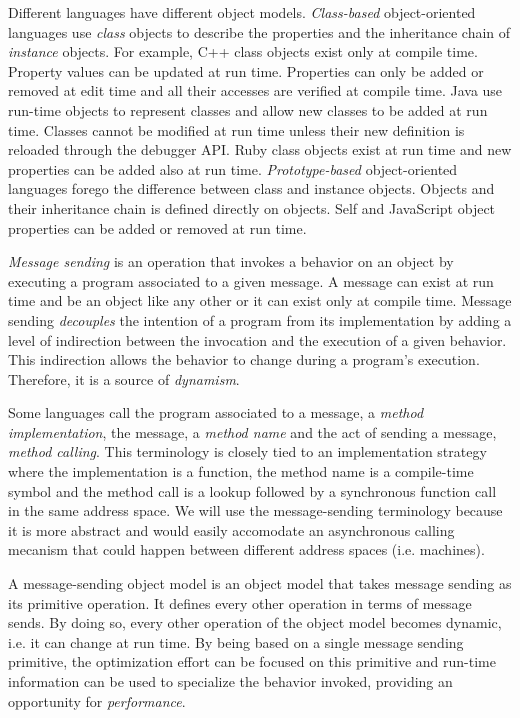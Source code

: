 Different languages have different object models. \textit{Class-based}
object-oriented languages use \textit{class} objects to describe the properties
and the inheritance chain of \textit{instance} objects. For example, C++ class
objects exist only at compile time. Property values can be updated at run time.
Properties can only be added or removed at edit time and all their accesses are
verified at compile time. Java use run-time objects to represent classes and
allow new classes to be added at run time.  Classes cannot be modified at run
time unless their new definition is reloaded through the debugger API. Ruby
class objects exist at run time and new properties can be added also at run
time. \textit{Prototype-based} object-oriented languages forego the difference
between class and instance objects. Objects and their inheritance chain is
defined directly on objects. Self and JavaScript object properties can be
added or removed at run time. 

\textit{Message sending} is an operation that invokes a behavior on an object by
executing a program associated to a given message.  A message can exist at run
time and be an object like any other or it can exist only at compile time.
Message sending \textit{decouples} the intention of a program from its
implementation by adding a level of indirection between the invocation and the
execution of a given behavior. This indirection allows the behavior to change
during a program's execution. Therefore, it is a source of \textit{dynamism}.

Some languages call the program associated to a message, a \textit{method
implementation}, the message, a \textit{method name} and the act of sending a
message, \textit{method calling}. This terminology is closely tied to an
implementation strategy where the implementation is a function, the method name
is a compile-time symbol and the method call is a lookup followed by a
synchronous function call in the same address space. We will use the
message-sending terminology because it is more abstract and would easily
accomodate an asynchronous calling mecanism that could happen between different
address spaces (i.e. machines). 

A message-sending object model is an object model that takes message sending as
its primitive operation. It defines every other operation in terms of message
sends. By doing so, every other operation of the object model becomes dynamic,
i.e. it can change at run time. By being based on a single message sending
primitive, the optimization effort can be focused on this primitive and
run-time information can be used to specialize the behavior invoked, providing
an opportunity for \textit{performance}. 

